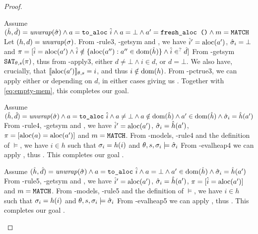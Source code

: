 \begin{proof}
\begin{hypvlist}
 Assume $(\hat{h},\hat{d})={\operatorname{\mathit{unwrap}}}(\hat{\sigma}) \land a = \texttt{to\_aloc}~\hat{i} \land a = \bot \land a'=\texttt{fresh\_aloc ()} \land m=\texttt{MATCH}$
 Let $(h,d)={\operatorname{\mathit{unwrap}}}(\sigma)$.%
 From \hyp{rule3}, \hyp{getsym} and , we have $\hat{i}'=\text{aloc}(a')$, $\hat{\sigma}_i=\bot$ and $\\{\pi=[\hat{i}=\text{aloc}(a') \land \hat{i}\notin\{\text{aloc}(a''):a''\in \operatorname{dom}(\hat{h})\} \land \hat{i} \in^? \hat{d}]}$%
 From \hyp{getsym} $\texttt{SAT}_{\mathit{\theta,s}}(\pi)$, thus from \hyp{apply3}, either $d\neq\bot\land i\in d$, or $d=\bot$. We also have, crucially, that $\llbracket\text{aloc}(a')\rrbracket_{\theta,s}=i$, and thus $i\notin \operatorname{dom}(h)$.
 From \hyp{pctrue3}, we can apply either  or  depending on $d$, in either cases giving us . Together with \ref{eq:empty-mem}, this completes our goal.
\end{hypvlist}


\begin{hypvlist}
 Assume $(\hat{h},\hat{d})={\operatorname{\mathit{unwrap}}}(\hat{\sigma}) \land a = \texttt{to\_aloc}~\hat{i} \land a \neq\bot \land a\notin \operatorname{dom}(\hat{h}) \land {a'\in\operatorname{dom}(\hat{h})} \land \hat{\sigma}_i=\hat{h}(a')$
 From \hyp{rule4}, \hyp{getsym} and , we have $\hat{i}'=\text{aloc}(a')$, $\hat{\sigma}_i=\hat{h}(a')$, ${\pi=[\text{aloc}(a)=\text{aloc}(a')]}$ and $m=\texttt{MATCH}$.
 From \hyp{models}, \hyp{rule4} and the definition of $\models$, we have $i\in h$ such that $\sigma_i=h(i)$ and ${\theta,s,\sigma_i\models\hat{\sigma}_i}$
 From \hyp{evalheap4} we can apply , thus . This completes our goal .
\end{hypvlist}


\begin{hypvlist}
 Assume $(\hat{h},\hat{d})={\operatorname{\mathit{unwrap}}}(\hat{\sigma}) \land a = \texttt{to\_aloc}~\hat{i} \land a=\bot \land a'\in\operatorname{dom}(\hat{h}) \land \hat{\sigma}_i=\hat{h}(a')$%
 From \hyp{rule5}, \hyp{getsym} and , we have $\hat{i}'=\text{aloc}(a')$, $\hat{\sigma}_i=\hat{h}(a')$, ${\pi=[\hat{i}=\text{aloc}(a')]}$ and $m=\texttt{MATCH}$.
 From \hyp{models}, \hyp{rule5} and the definition of $\models$, we have $i\in h$ such that $\sigma_i=h(i)$ and ${\theta,s,\sigma_i\models\hat{\sigma}_i}$
 From \hyp{evalheap5} we can apply , thus . This completes our goal .
\end{hypvlist}

\end{proof}
